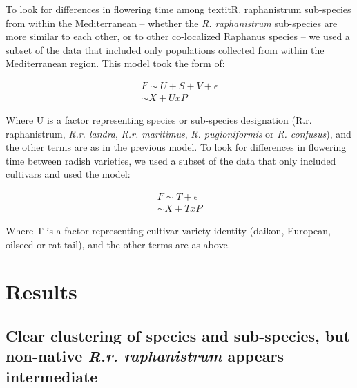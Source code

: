 \documentclass[twocolumn]{bmcart}%
\begin{document}
To look for differences in flowering time among textit{R. raphanistrum} sub-species from within the Mediterranean – whether the \textit{R. raphanistrum} sub-species are more similar to each other, or to other co-localized Raphanus species – we used a subset of the data that included only populations collected from within the Mediterranean region. This model took the form of:

\begin{gather*}
	F \sim U + S + V + \epsilon \\
	\sim X + U x P
\end{gather*}


Where U is a factor representing species or sub-species designation (R.r. raphanistrum, \textit{R.r. landra}, \textit{R.r. maritimus}, \textit{R. pugioniformis} or \textit{R. confusus}), and the other terms are as in the previous model.
To look for differences in flowering time between radish varieties, we used a subset of the data that only included cultivars and used the model:

\begin{gather*}
	F \sim T + \epsilon \\
  \sim X + T x P
\end{gather*}

Where T is a factor representing cultivar variety identity (daikon, European, oilseed or rat-tail), and the other terms are as above.

\section*{Results} 

\subsection*{Clear clustering of species and sub-species, but non-native \textit{R.r. raphanistrum} appears intermediate}
\end{document}
